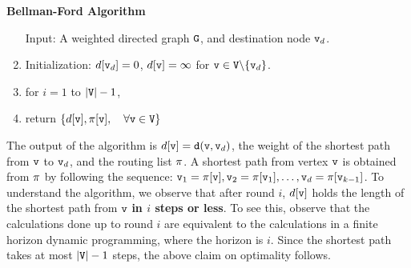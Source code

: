 \begin{algorithm_}\textbf{Bellman-Ford Algorithm}
\begin{enumerate}
\item[ Input: ] A weighted directed graph ${\tt G}$, and destination node ${\tt v}_d$.

\item Initialization:   $d[{\tt v}_d] = 0$,  $d[{\tt v}] = \infty $ for ${\tt v} \in {\tt V}\backslash \{ {\tt v}_d\} $.
                           \\

\item for  $i = 1$ to $|{\tt V}| - 1$,



	  






\item return $\{ d[{\tt v}],\pi [{\tt v}], \quad  \forall {\tt v} \in {\tt V}\} $
\end{enumerate}
\end{algorithm_}

The output of the algorithm is $d[{\tt v}] = {\tt d}({\tt v},{\tt v}_d)$, the weight of the shortest path from ${\tt v}$ to ${\tt v}_d$, and the routing list $\pi$. A shortest path from vertex ${\tt v}$ is obtained from $\pi $ by following the sequence: ${{\tt v}_1} = \pi [{\tt v}], {{\tt v}_2} = \pi [{{\tt v}_1}],  \ldots ,{\tt v}_d = \pi [{{\tt v}_{k - 1}}]$.
To understand the algorithm, we observe that after round $i$, $d[{\tt v}]$ holds the length of the shortest path from ${\tt v}$ \textbf{in $i$ steps or less}. To see this, observe that the calculations done up to round $i$ are equivalent to the calculations in a finite horizon dynamic programming, where the horizon is $i$. Since the shortest path takes at most $|{\tt V}| - 1$ steps, the above claim on optimality follows.

